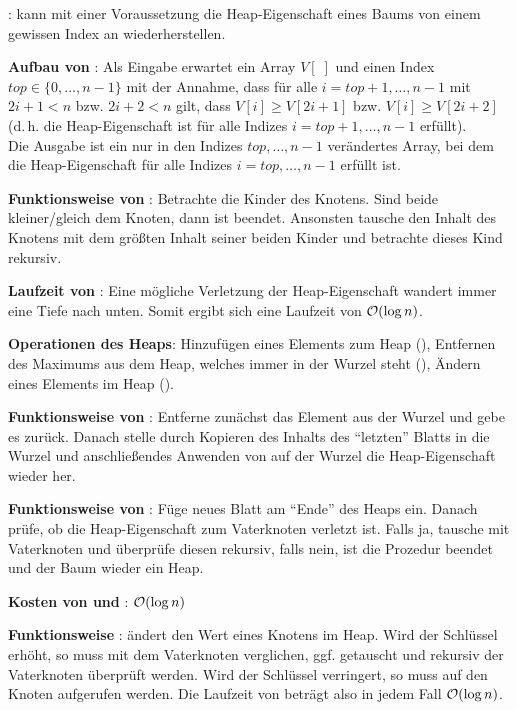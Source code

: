 \linie

\textbf{}:
 kann mit einer Voraussetzung die Heap-Eigenschaft eines Baums
von einem gewissen Index an wiederherstellen.

\textbf{Aufbau von }:
Als Eingabe erwartet  ein Array $V[\;]$ und einen Index
$top \in \{0, \ldots, n - 1\}$ mit der Annahme,
dass für alle $i = top + 1, \ldots, n - 1$ mit $2i + 1 < n$ bzw.
$2i + 2 < n$ gilt, dass $V[i] \ge V[2i + 1]$ bzw. $V[i] \ge V[2i + 2]$
(d.\,h. die Heap-Eigenschaft ist für alle Indizes $i = top + 1, \ldots, n - 1$
erfüllt). \\
Die Ausgabe ist ein nur in den Indizes $top, \ldots, n - 1$ verändertes
Array, bei dem die Heap-Eigenschaft für alle Indizes $i = top, \ldots, n - 1$
erfüllt ist.

\textbf{Funktionsweise von }:
Betrachte die Kinder des Knotens.
Sind beide kleiner/gleich dem Knoten, dann ist  beendet.
Ansonsten tausche den Inhalt des Knotens mit dem größten Inhalt seiner beiden
Kinder und betrachte dieses Kind rekursiv.

\textbf{Laufzeit von }:
Eine mögliche Verletzung der Heap-Eigenschaft wandert immer eine Tiefe nach
unten.
Somit ergibt sich eine Laufzeit von $\mathcal{O}(\log n)$.

\linie

\textbf{Operationen des Heaps}:
Hinzufügen eines Elements zum Heap (),
Entfernen des Maximums aus dem Heap, welches immer in der Wurzel steht
(),
Ändern eines Elements im Heap ().

\textbf{Funktionsweise von }:
Entferne zunächst das Element aus der Wurzel und gebe es zurück.
Danach stelle durch Kopieren des Inhalts des "`letzten"' Blatts in die Wurzel
und anschließendes Anwenden von  auf der Wurzel die
Heap-Eigenschaft wieder her.

\textbf{Funktionsweise von }:
Füge neues Blatt am "`Ende"' des Heaps ein.
Danach prüfe, ob die Heap-Eigenschaft zum Vaterknoten verletzt ist.
Falls ja, tausche mit Vaterknoten und überprüfe diesen rekursiv,
falls nein, ist die Prozedur beendet und der Baum wieder ein Heap.

\textbf{Kosten von  und }:
$\mathcal{O}(\log n)$

\textbf{Funktionsweise }:
 ändert den Wert eines Knotens im Heap.
Wird der Schlüssel erhöht, so muss mit dem Vaterknoten verglichen,
ggf. getauscht und rekursiv der Vaterknoten überprüft werden.
Wird der Schlüssel verringert, so muss  auf den Knoten aufgerufen
werden.
Die Laufzeit von  beträgt also in jedem Fall $\mathcal{O}(\log n)$.

